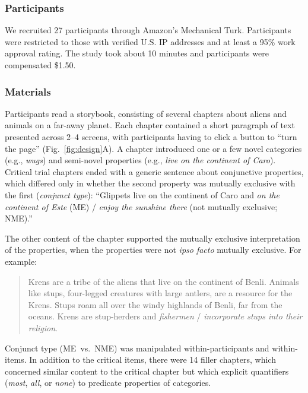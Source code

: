 \documentclass[10pt,letterpaper]{article}
\begin{document}
\subsubsection{Participants}

We recruited 27 participants through Amazon's Mechanical Turk.
Participants were restricted to those with verified U.S. IP addresses and at least a 95\% work approval rating. 
The study took about 10 minutes and participants were compensated \$1.50.

\subsubsection{Materials}

Participants read a storybook, consisting of several chapters about aliens and animals on a far-away planet.
Each chapter contained a short paragraph of text presented across 2--4 screens, with participants having to click a button to ``turn the page'' (Fig.~\ref{fig:design}A).
A chapter introduced one or a few novel categories (e.g., \emph{wugs}) and semi-novel properties (e.g., \emph{live on the continent of Caro}).
Critical trial chapters ended with a generic sentence about conjunctive properties, which differed only in whether the second property was mutually exclusive with the first (\emph{conjunct type}): ``Glippets live on the continent of Caro and \emph{on the continent of Este} (ME) /  \emph{enjoy the sunshine there} (not mutually exclusive; NME).''

The other content of the chapter supported the mutually exclusive interpretation of the properties, when the properties were not \emph{ipso facto} mutually exclusive. For example: 

\vspace{-0.1cm}
\begin{quote}
\small
Krens are a tribe of the aliens that live on the continent of Benli. Animals like stups, four-legged creatures with large antlers, are a resource for the Krens. Stups roam all over the windy highlands of Benli, far from the oceans. Krens are stup-herders and \emph{fishermen} / \emph{incorporate stups into their religion}.
\end{quote}
\vspace{-0.1cm}


Conjunct type (ME~vs.~NME) was manipulated within-participants and within-items. 
In addition to the critical items, there were 14 filler chapters, which concerned similar content to the critical chapter but which explicit quantifiers (\emph{most}, \emph{all}, or \emph{none}) to predicate properties of categories. 
\end{document}
